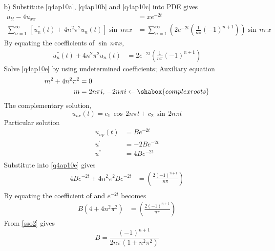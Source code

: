b) Substitute \eqref{q4ap10a}, \eqref{q4ap10b} and \eqref{q4ap10c} into PDE gives
\begin{align}
u_{tt}-4u_{xx}&=xe^{-2t}\\
\sum_{n=1}^\infty\,\left[u_n^{''}(t)+4n^2\pi^2u_n(t)\right]\sin\,n\pi x&=\sum_{n=1}^\infty\left(2e^{-2t}\left(\frac{1}{n\pi}(-1)^{n+1}\right)\right)\sin\,n\pi x\label{q4ap10d}
\end{align}
By equating the coefficients of $\sin\,n\pi x$,
\begin{align}
u_n^{''}(t)+4n^2\pi^2u_n(t)&=2e^{-2t}\left(\frac{1}{n\pi}(-1)^{n+1}\right)\label{q4ap10e}
\end{align}
Solve \eqref{q4ap10e} by using undetermined coefficients;
Auxiliary equation
\begin{align*}
m^2+4n^2\pi^2&=0\\
m&=2n\pi i,\,-2n\pi i\leftarrow\shabox{complex roots}
\end{align*}
The complementary solution,
\begin{equation}
u_{nc}(t)=c_1\,\cos\,2n\pi t+c_2\,\sin\,2n\pi t\label{a4ap10f}
\end{equation}
Particular solution 
\begin{align*}
u_{np}(t)&=Be^{-2t}\\
u^{'}&=-2Be^{-2t}\\
u^{''}&=4Be^{-2t}\\
\end{align*}
Substitute into \eqref{q4ap10e} gives
\begin{align*}
4Be^{-2t}+4n^2\pi^2Be^{-2t}&=\left(\frac{2(-1)^{n+1}}{n\pi}\right)\\
\end{align*}
By equating the coefficient of  and $e^{-2t}$ becomes
\begin{align}
B(4+4n^2\pi^2)&=\left(\frac{2(-1)^{n+1}}{n\pi}\right)
\label{sso2}
\end{align}
From \eqref{sso2} gives
\begin{equation}
B=\frac{(-1)^{n+1}}{2n\pi(1+n^2\pi^2)}\label{sso3} 
\end{equation}

